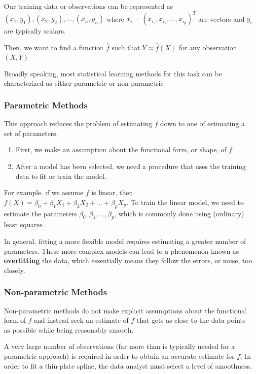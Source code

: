 \documentclass{article}
\begin{document}
Our training data or observations can be represented as ${(x_1, y_1),(x_2, y_2),...,(x_n, y_n)}$ where $x_i = (x_{i_1}, x_{i_2},...,x_{i_p})^T$ are vectors and $y_i$ are typically scalars.

Then, we want to find a function $\hat f$ such that $Y \approx \hat f(X)$ for any observation $(X, Y)$

Broadly speaking, most statistical learning methods for this task can be characterized as either parametric or non-parametric

\subsubsection*{Parametric Methods}

This approach reduces the problem of estimating $f$ down to one of estimating a set of parameters.

\begin{enumerate}
    \item First, we make an assumption about the functional form, or shape, of $f$.
    
    \item After a model has been selected, we need a procedure that uses the training data to fit or train the model.
\end{enumerate}

For example, if we assume $f$ is linear, then $f(X) = \beta_0 + \beta_1X_1 + \beta_2X_2 + ... + \beta_p X_p$. To train the linear model, we need to estimate the parameters $\beta_0, \beta_1,..., \beta_p$, which is commonly done using (ordinary) least squares.


In general, fitting a more flexible model requires estimating a
greater number of parameters. These more complex models can lead to a phenomenon known as \textbf{overfitting} the data, which essentially means they follow the errors, or noise, too closely.

\subsubsection*{Non-parametric Methods}
Non-parametric methods do not make explicit assumptions about the functional form of $f$ and instead seek an estimate of $f$ that gets as close to the data points as possible while being reasonably smooth.

A very large number of observations (far more than is typically needed for a parametric approach) is required in order to obtain an accurate estimate for $f$. In order to fit a thin-plate spline, the data analyst must select a level of smoothness.
\end{document}
